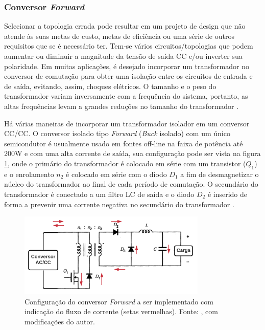 \subsubsection*{Conversor \textit{Forward}}

Selecionar a topologia errada pode resultar em um projeto de design que não atende às suas metas de custo, metas de eficiência ou uma série de outros requisitos que se é necessário ter. Tem-se vários circuitos/topologias que podem aumentar ou diminuir a magnitude da tensão de saída CC e/ou inverter sua polaridade. Em muitas aplicações, é desejado incorporar um transformador no conversor de comutação para obter uma isolação entre os circuitos de entrada e de saída, evitando, assim, choques elétricos. O tamanho e o peso do transformador variam inversamente com a frequência do sistema, portanto, as altas frequências levam a grandes reduções no tamanho do transformador \cite{forward}.

Há várias maneiras de incorporar um transformador isolador em um conversor CC/CC. O conversor isolado tipo \textit{Forward} (\textit{Buck} isolado) com um único semicondutor é usualmente usado em fontes off-line na faixa de potência até 200W e com uma alta corrente de saída, sua configuração pode ser vista na figura \ref{fig:energia_forward}, onde o primário do transformador é colocado em série com um transistor ($Q_{1}$) e o enrolamento $n_{2}$ é colocado em série com o diodo $D_{1}$ a fim de desmagnetizar o núcleo do transformador ao final de cada período de comutação. O secundário do transformador é conectado a um filtro LC de saída e o diodo $D_{2}$ é inserido de forma a prevenir uma corrente negativa no secundário do transformador  \cite{Conversores}.

\begin{figure}[H]
\centering
    \includegraphics[width=0.8\textwidth]{figuras/Energia_forward.PNG}
    \caption{Configuração do conversor  \textit{Forward} a ser implementado com indicação do fluxo de corrente (setas vermelhas). Fonte: , com modificações do autor.}
    \label{fig:energia_forward}
\end{figure}


